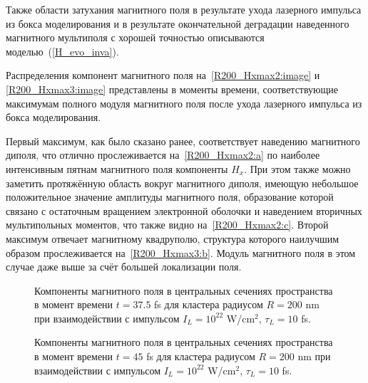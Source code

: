 Также области затухания магнитного поля в результате ухода лазерного импульса из бокса моделирования и в результате окончательной деградации наведенного магнитного мультиполя с хорошей точностью описываются моделью~(\ref{H_evo_inva}).

Распределения компонент магнитного поля на~\autoref{R200_Hxmax2:image} и \autoref{R200_Hxmax3:image} представлены в моменты времени, соответствующие максимумам полного модуля магнитного поля после ухода лазерного импульса из бокса моделирования.

Первый максимум, как было сказано ранее, соответствует наведению магнитного диполя, что отлично прослеживается на~\autoref{R200_Hxmax2:a} по наиболее интенсивным пятнам магнитного поля компоненты $H_x$. При этом также можно заметить протяжённую область вокруг магнитного диполя, имеющую небольшое положительное значение амплитуды магнитного поля, образование которой связано с остаточным вращением электронной оболочки и наведением вторичных мультипольных моментов, что также видно на~\autoref{R200_Hxmax2:c}. Второй максимум отвечает магнитному квадруполю, структура которого наилучшим образом прослеживается на~\autoref{R200_Hxmax3:b}. Модуль магнитного поля в этом случае даже выше за счёт большей локализации поля.

\begin{figure}[H]
    \hfil
    \caption{Компоненты магнитного поля в центральных сечениях пространства в момент времени $t = 37.5$ fs для кластера радиусом $R = 200$ nm при взаимодействии с импульсом $I_L = 10^{22}$ W/cm$^{2}$, $\tau_L = 10$ fs.}\label{R200_Hxmax2:image}
\end{figure}

\begin{figure}[H]
    \hfil
    \caption{Компоненты магнитного поля в центральных сечениях пространства в момент времени $t = 45$ fs для кластера радиусом $R = 200$ nm при взаимодействии с импульсом $I_L = 10^{22}$ W/cm$^{2}$, $\tau_L = 10$ fs.}\label{R200_Hxmax3:image}
\end{figure}

